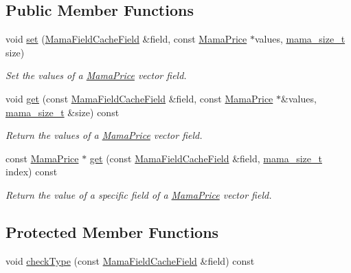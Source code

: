 \subsection*{Public Member Functions}
\begin{DoxyCompactItemize}
\item 
void \hyperlink{classWombat_1_1MamaFieldCacheFieldPriceVector_adb2993b30ca000aa2cfd7a77ad3be899}{set} (\hyperlink{classWombat_1_1MamaFieldCacheField}{MamaFieldCacheField} \&field, const \hyperlink{classWombat_1_1MamaPrice}{MamaPrice} $\ast$values, \hyperlink{classmama__size__t}{mama\_\-size\_\-t} size)
\begin{DoxyCompactList}\small\item\em Set the values of a \hyperlink{classWombat_1_1MamaPrice}{MamaPrice} vector field. \item\end{DoxyCompactList}\item 
void \hyperlink{classWombat_1_1MamaFieldCacheFieldPriceVector_ad3b8e536c41f426305213795471df26e}{get} (const \hyperlink{classWombat_1_1MamaFieldCacheField}{MamaFieldCacheField} \&field, const \hyperlink{classWombat_1_1MamaPrice}{MamaPrice} $\ast$\&values, \hyperlink{classmama__size__t}{mama\_\-size\_\-t} \&size) const 
\begin{DoxyCompactList}\small\item\em Return the values of a \hyperlink{classWombat_1_1MamaPrice}{MamaPrice} vector field. \item\end{DoxyCompactList}\item 
const \hyperlink{classWombat_1_1MamaPrice}{MamaPrice} $\ast$ \hyperlink{classWombat_1_1MamaFieldCacheFieldPriceVector_a1bc34920cd888b55c341cb650e86e510}{get} (const \hyperlink{classWombat_1_1MamaFieldCacheField}{MamaFieldCacheField} \&field, \hyperlink{classmama__size__t}{mama\_\-size\_\-t} index) const 
\begin{DoxyCompactList}\small\item\em Return the value of a specific field of a \hyperlink{classWombat_1_1MamaPrice}{MamaPrice} vector field. \item\end{DoxyCompactList}\end{DoxyCompactItemize}
\subsection*{Protected Member Functions}
\begin{DoxyCompactItemize}
\item 
void \hyperlink{classWombat_1_1MamaFieldCacheFieldPriceVector_aa6144ba25d0518d127aadfb75ab97182}{checkType} (const \hyperlink{classWombat_1_1MamaFieldCacheField}{MamaFieldCacheField} \&field) const 
\end{DoxyCompactItemize}


